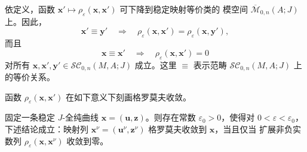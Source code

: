 \begin{remark}\label{rem:5-5-7}
依定义，函数
$\mathbf x'\mapsto\rho_\varepsilon(\mathbf x,\mathbf x')$ 可下降到稳定映射等价类的
模空间 $\overline{\mathcal M}_{0,n}(A;J)$ 上。因此，
\[
  \mathbf x'\equiv\mathbf y'
  \quad\Longrightarrow\quad
  \rho_\varepsilon(\mathbf x,\mathbf x')
  =\rho_\varepsilon(\mathbf x,\mathbf y'),
\]
而且
\[
  \mathbf x\equiv\mathbf x'
  \quad\Longrightarrow\quad
  \rho_\varepsilon(\mathbf x,\mathbf x')=0
\]
对所有
$\mathbf x,\mathbf x',\mathbf y'\in\mathcal{SC}_{0,n}(M,A;J)$ 成立。这里
$\equiv$ 表示范畴 $\mathcal{SC}_{0,n}(M,A;J)$ 上的等价关系。
\end{remark}

函数 $\rho_\varepsilon(\mathbf x,\mathbf x')$ 在如下意义下刻画格罗莫夫收敛。

\begin{lemma}\label{lem:5-5-8}
固定一条稳定 $J$-全纯曲线 $\mathbf x=(\mathbf u,\mathbf z)$。则存在常数
$\varepsilon_0>0$，使得对 $0<\varepsilon<\varepsilon_0$，下述结论成立：映射列
$\mathbf x^\nu=(\mathbf u^\nu,\mathbf z^\nu)$ 格罗莫夫收敛到 $\mathbf x$，当且仅当
扩展非负实数列 $\rho_\varepsilon(\mathbf x,\mathbf x^\nu)$ 收敛到零。
\end{lemma}

